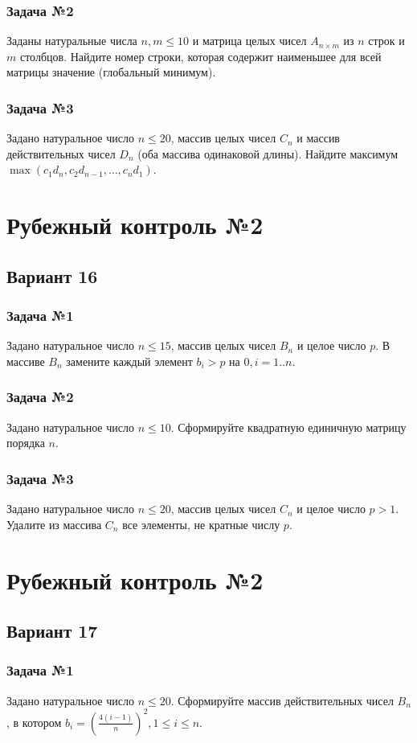 \documentclass[12pt,a5paper,landscape]{report}
\begin{document}
\subsubsection*{Задача №2}
Заданы натуральные числа $n, m \le 10$ и матрица целых чисел $A_{n \times m}$ из $n$ строк и $m$ столбцов. Найдите номер строки, которая содержит наименьшее для всей матрицы значение (глобальный минимум).
\subsubsection*{Задача №3}
Задано натуральное число $n \le 20$, массив целых чисел $C_n$ и массив действительных чисел $D_n$ (оба массива одинаковой длины). Найдите максимум $\max({ c_1 d_n, c_2 d_{n-1}, \ldots, c_n d_1 })$.


\clearpage
\section*{Рубежный контроль №2}
\subsection*{Вариант 16}
\subsubsection*{Задача №1}
Задано натуральное число $n \le 15$, массив целых чисел $B_n$ и целое число $p$. В массиве $B_n$ замените каждый элемент $b_i > p$ на $0, i = 1..n$.
\subsubsection*{Задача №2}
Задано натуральное число $n \le 10$. Сформируйте квадратную единичную матрицу порядка $n$.
\subsubsection*{Задача №3}
Задано натуральное число $n \le 20$, массив целых чисел $C_n$ и целое число $p > 1$. Удалите из массива $C_n$ все элементы, не кратные числу $p$.


\clearpage
\section*{Рубежный контроль №2}
\subsection*{Вариант 17}
\subsubsection*{Задача №1}
Задано натуральное число $n \le 20$. Сформируйте массив действительных чисел $B_n$, в котором $b_i = (\frac {4(i-1)} {n})^2, 1 \le i \le n$.
\end{document}
